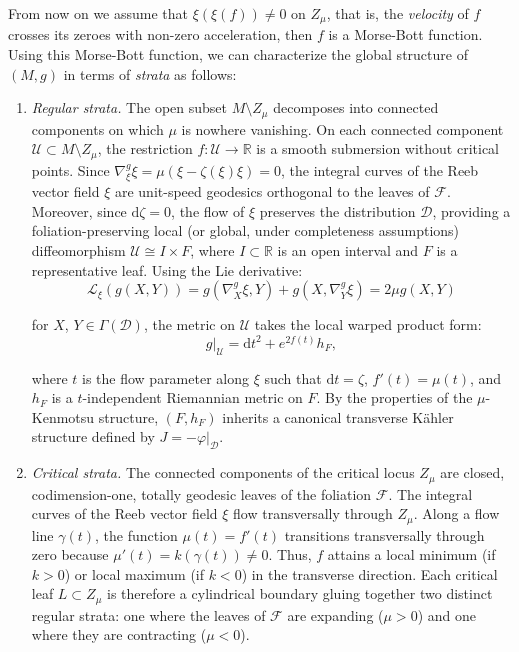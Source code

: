 \documentclass[10pt,a4paper,twoside,reqno]{amsart}
\theoremstyle{plain}
\theoremstyle{definition}
\theoremstyle{remark}
\def\dd{\mathrm{d}}
\def\dd{\mathrm{d}}
\def\cU{\mathcal{U}}
\begin{document}
From now on we assume that $\xi(\xi(f))\neq 0$ on $Z_{\mu}$, that is, the \emph{velocity} of $f$ crosses its zeroes with non-zero acceleration, then $f$ is a Morse-Bott function. Using this Morse-Bott function, we can characterize the global structure of $(M,g)$ in terms of \emph{strata} as follows:
\begin{enumerate}
\item \textit{Regular strata.} The open subset $M \setminus Z_\mu$ decomposes into connected components on which $\mu$ is nowhere vanishing. On each connected component $\mathcal{U} \subset M \setminus Z_\mu$, the restriction $f\colon \cU \to \mathbb{R}$ is a smooth submersion without critical points. Since $\nabla_{\xi}^g \xi = \mu(\xi-\zeta(\xi)\xi) = 0$, the integral curves of the Reeb vector field $\xi$ are unit-speed geodesics orthogonal to the leaves of $\mathcal{F}$. Moreover, since $\dd \zeta = 0$, the flow of $\xi$ preserves the distribution $\mathcal{D}$, providing a foliation-preserving local (or global, under completeness assumptions) diffeomorphism $\mathcal{U} \cong I \times F$, where $I \subset \mathbb{R}$ is an open interval and $F$ is a representative leaf. Using the Lie derivative:
\begin{equation*}
\mathcal{L}_\xi(g(X,Y)) = g(\nabla_X^g \xi, Y) + g(X, \nabla_Y^g \xi) = 2\mu g(X,Y)
\end{equation*}

\noindent
for $X$, $Y \in \Gamma(\mathcal{D})$, the metric on $\mathcal{U}$ takes the local warped product form:
\begin{equation*}
g\vert_{\mathcal{U}} = \dd t^2 + e^{2f(t)} h_F,
\end{equation*}

\noindent
where $t$ is the flow parameter along $\xi$ such that $\dd t = \zeta$, $f'(t) = \mu(t)$, and $h_F$ is a $t$-independent Riemannian metric on $F$. By the properties of the $\mu$-Kenmotsu structure, $(F,h_F)$ inherits a canonical transverse Kähler structure defined by $J = -\varphi\vert_{\mathcal{D}}$.

\item \textit{Critical strata.} The connected components of the critical locus $Z_\mu$ are closed, codimension-one, totally geodesic leaves of the foliation $\mathcal{F}$. The integral curves of the Reeb vector field $\xi$ flow transversally through $Z_\mu$. Along a flow line $\gamma(t)$, the function $\mu(t) = f'(t)$ transitions transversally through zero because $\mu'(t) = k(\gamma(t)) \neq 0$. Thus, $f$ attains a local minimum (if $k > 0$) or local maximum (if $k < 0$) in the transverse direction. Each critical leaf $L \subset Z_\mu$ is therefore a cylindrical boundary gluing together two distinct regular strata: one where the leaves of $\mathcal{F}$ are expanding ($\mu > 0$) and one where they are contracting ($\mu < 0$).
\end{enumerate}
\end{document}
